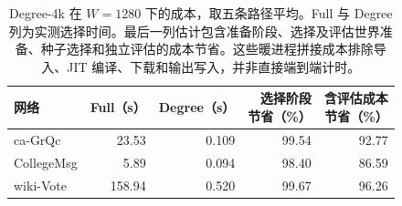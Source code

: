 \begin{table}[htbp]
\caption{Degree-4k 在 $W=1280$ 下的成本，取五条路径平均。Full 与 Degree 列为实测选择时间。最后一列估计包含准备阶段、选择及评估世界准备、种子选择和独立评估的成本节省。这些暖进程拼接成本排除导入、JIT 编译、下载和输出写入，并非直接端到端计时。}\label{tab:cost}
\begin{tabular}{lrrrr}
\toprule
网络 & Full（s） & Degree（s） & \shortstack{选择阶段\\节省（\%）} & \shortstack{含评估成本\\节省（\%）} \\
\midrule
ca-GrQc & 23.53 & 0.109 & 99.54 & 92.77 \\
CollegeMsg & 5.89 & 0.094 & 98.40 & 86.59 \\
wiki-Vote & 158.94 & 0.520 & 99.67 & 96.26 \\
\bottomrule
\end{tabular}
\end{table}
